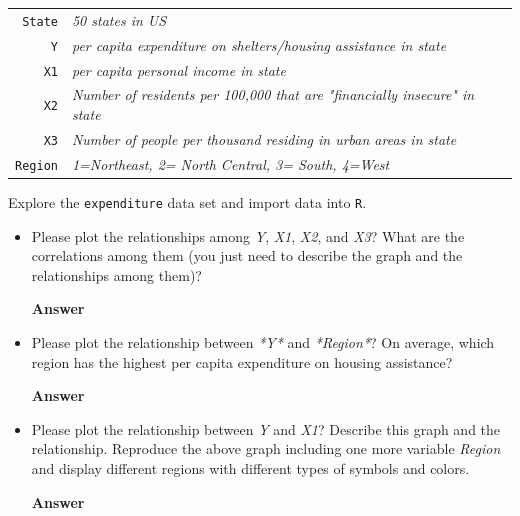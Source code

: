\documentclass[12pt,letterpaper]{article}
\begin{document}
\begin{tabular}{r|l}
    \texttt{State} &\emph{50 states in US} \\
    \texttt{Y} & \emph{per capita expenditure on shelters/housing assistance in state}\\
    \texttt{X1} &\emph{per capita personal income in state} \\
	\texttt{X2} &  \emph{Number of residents per 100,000 that are "financially insecure" in state}\\
	\texttt{X3} &  \emph{Number of people per thousand residing in urban areas in state} \\
	\texttt{Region} &  \emph{1=Northeast, 2= North Central, 3= South, 4=West} \\
\end{tabular}

\vspace{.5cm}
\noindent Explore the \texttt{expenditure} data set and import data into \texttt{R}.

\vspace{.5cm}
  

\vspace{.5cm}
\begin{itemize}

\item
Please plot the relationships among \emph{Y}, \emph{X1}, \emph{X2}, and \emph{X3}? What are the correlations among them (you just need to describe the graph and the relationships among them)?

\textbf{Answer}

\vspace{.5cm}
\item

Please plot the relationship between \emph{*Y*} and \emph{*Region*}? On average, which region has the highest per capita expenditure on housing assistance?

\textbf{Answer}

\vspace{.5cm}
\item
Please plot the relationship between \emph{Y} and \emph{X1}? Describe this graph and the relationship. Reproduce the above graph including one more variable \emph{Region} and display different regions with different types of symbols and colors.

\textbf{Answer}

\end{itemize}
\end{document}
